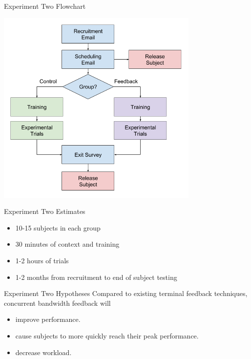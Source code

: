 \documentclass[10pt]{beamer}
\begin{document}
\begin{frame}[fragile]{Experiment Two Flowchart}
  \begin{center}
    \includegraphics[width=0.75\textwidth]{../img/robot_flow.png}
  \end{center}
\end{frame}

\begin{frame}[fragile]{Experiment Two Estimates}
  \begin{itemize}
    \setlength\itemsep{1em}
    \item 10-15 subjects in each group
    \item 30 minutes of context and training
    \item 1-2 hours of trials
    \item 1-2 months from recruitment to end of subject testing
  \end{itemize}
\end{frame}

\begin{frame}[fragile]{Experiment Two Hypotheses}
Compared to existing terminal feedback techniques, concurrent bandwidth feedback will
  \begin{itemize}
  \item improve performance.
  \item cause subjects to more quickly reach their peak performance.
  \item decrease workload.
  \end{itemize}
\end{frame}
\end{document}
